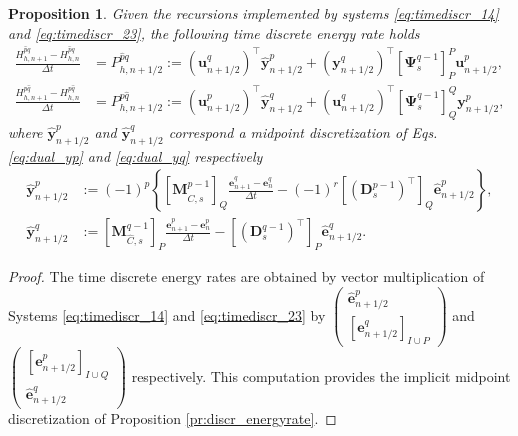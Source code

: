 \documentclass{elsarticle}
\newtheorem{proposition}{Proposition}
\newcommand*{\dual}[1]{\ensuremath{\widehat{#1}}}
\begin{document}
\begin{proposition}\label{pr:discrtime_energyrate}
Given the recursions implemented by systems \eqref{eq:timediscr_14} and \eqref{eq:timediscr_23}, the following time discrete energy rate holds
\begin{equation}
\begin{aligned}
    \frac{H^{\dual{p}q}_{h, n+1} - H^{\dual{p}q}_{h, n}}{\Delta t} &= P_{h, n+1/2}^{\dual{p}q} := (\mathbf{u}^q_{n+1/2})^\top \dual{\mathbf{y}}^p_{n+1/2} +  (\mathbf{y}^q_{n+1/2})^\top [\mathbf{\Psi}^{q-1}_{s}]_{P}^{P} \mathbf{u}^p_{n+1/2}, \\
    \frac{H^{p\dual{q}}_{h, n+1} - H^{p\dual{q}}_{h, n}}{\Delta t} 
    &= P_{h, n+1/2}^{p\dual{q}} := (\mathbf{u}^p_{n+1/2})^\top \dual{\mathbf{y}}^q_{n+1/2} +  (\mathbf{u}^q_{n+1/2})^\top [\mathbf{\Psi}^{q-1}_{s}]_{Q}^{Q} \mathbf{y}^p_{n+1/2},
\end{aligned}
\end{equation}
where $\dual{\mathbf{y}}^p_{n+1/2}$ and $\dual{\mathbf{y}}^q_{n+1/2}$ correspond a midpoint discretization of Eqs. \eqref{eq:dual_yp} and \eqref{eq:dual_yq} respectively
\begin{equation}
\begin{aligned}
\dual{\mathbf{y}}^p_{n+1/2} &:= (-1)^p \left\{[\mathbf{M}^{p-1}_{\dual{C}, s}]_{Q} \frac{\mathbf{e}^q_{n+1}-\mathbf{e}^q_{n}}{\Delta t}  -(-1)^r[(\mathbf{D}_{s}^{p-1})^\top]_{Q} \dual{\mathbf{e}}^p_{n+1/2}\right\}, \\
\dual{\mathbf{y}}^q_{n+1/2} &:= [\mathbf{M}^{q-1}_{\dual{C}, s}]_{P} \frac{\mathbf{e}^p_{n+1} - \mathbf{e}^p_{n}}{\Delta t} -[(\mathbf{D}_{s}^{q-1})^\top]_{P} \dual{\mathbf{e}}^q_{n+1/2}.
\end{aligned}
\end{equation}
\end{proposition}
\begin{proof}
The time discrete energy rates are obtained by vector multiplication of Systems \eqref{eq:timediscr_14} and \eqref{eq:timediscr_23} by $\begin{pmatrix}
    \dual{\mathbf{e}}^p_{n+1/2} \\ [\mathbf{e}^q_{n+1/2}]_{I\cup P}
\end{pmatrix}$ and $\begin{pmatrix}
    [\mathbf{e}^p_{n+1/2}]_{I\cup Q} \\ \dual{\mathbf{e}}^q_{n+1/2}
    \end{pmatrix}$ respectively. This computation provides the implicit midpoint discretization of Proposition \ref{pr:discr_energyrate}.
\end{proof}
\end{document}
